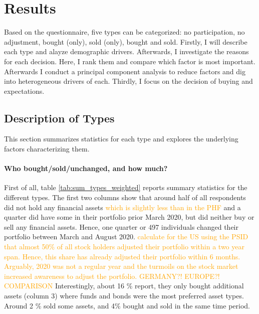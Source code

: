 \documentclass[ProjectABM]{subfiles}
\begin{document}
\section{Results}\label{sec:results}
Based on the questionnaire, five types can be categorized: no participation, no adjustment, bought (only), sold (only), bought and sold. Firstly, I will describe each type and alayze demographic drivers. Afterwards, I investigate the reasons for each decision. Here, I rank them and compare which factor is most important. Afterwards I conduct a principal component analysis to reduce factors and dig into heterogeneous drivers of each. Thirdly, I focus on the decision of buying and expectations. 

\subsection{Description of Types}\label{sec:des_types}
This section summarizes statistics for each type and explores the underlying factors characterizing them.

\paragraph{Who bought/sold/unchanged, and how much?}
First of all, table \ref{tab:sum_types_weighted} reports summary statistics for the different types.%
The first two columns show that around half of all respondents did not hold any financial assets \textcolor{orange}{which is slightly less than in the PHF} and a quarter did have some in their portfolio prior March 2020, but did neither buy or sell any financial assets. Hence, one quarter or 497 individuals changed their portfolio between March and August 2020. \textcolor{orange}{\cite{bonaparte_et_al_2012adjustment} calculate for the US using the PSID that almost 50\% of all stock holders adjusted their portfolio within a two year span. Hence, this share has already adjusted their portfolio within 6 months. Arguably, 2020 was not a regular year and the turmoils on the stock market increased awareness to adjust the portfolio. GERMANY?! EUROPE?! COMPARISON} Interestingly, about 16 \% report, they only bought additional assets (column 3) where funds and bonds were the most preferred asset types. Around 2 \% sold some assets, and 4\% bought and sold in the same time period.
\end{document}
